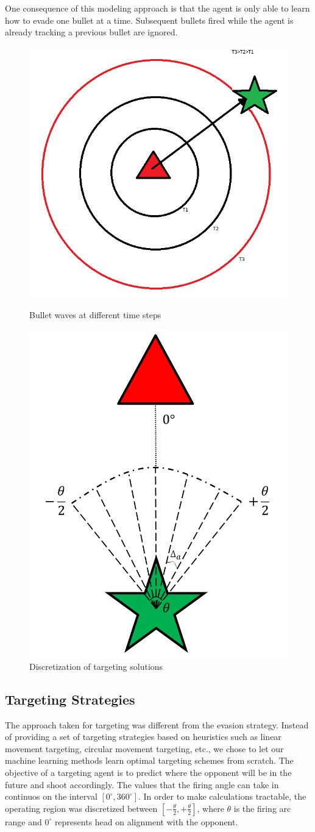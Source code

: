 \documentclass{article}
\theoremstyle{plain}
\theoremstyle{definition}
\theoremstyle{remark}
\begin{document}
One consequence of this modeling approach is that the agent is only able to learn how to evade one bullet at a time. Subsequent bullets fired while the agent is already tracking a previous bullet are ignored.

\begin{figure}[t]
\begin{minipage}[b]{0.5\linewidth}
	\centering
		\includegraphics[width=5 cm]{bullet_wave.png}
	\caption{Bullet waves at different time steps}
	\label{b_wave}
\end{minipage}
\hspace{0.5cm}
\begin{minipage}[b]{0.5\linewidth}
\centering
		\includegraphics[width=5 cm]{targeting.png}
	\caption{Discretization of targeting solutions}
	\label{tget}
\end{minipage}
\end{figure}

\subsection*{Targeting Strategies}
The approach taken for targeting was different from the evasion strategy. Instead of providing a set of targeting strategies based on heuristics such as linear movement targeting, circular movement targeting, etc., we chose to let our machine learning methods learn optimal targeting schemes from scratch. The objective of a targeting agent is to predict where the opponent will be in the future and shoot accordingly. The values that the firing angle can take in continuos on the interval $[0^{\circ}, 360^{\circ}]$. In order to make calculations tractable, the operating region was discretized between $[-\frac{\theta}{2}, +\frac{\theta}{2}]$, where $\theta$ is the firing arc range and $0^{\circ}$ represents head on alignment with the opponent.
\end{document}
